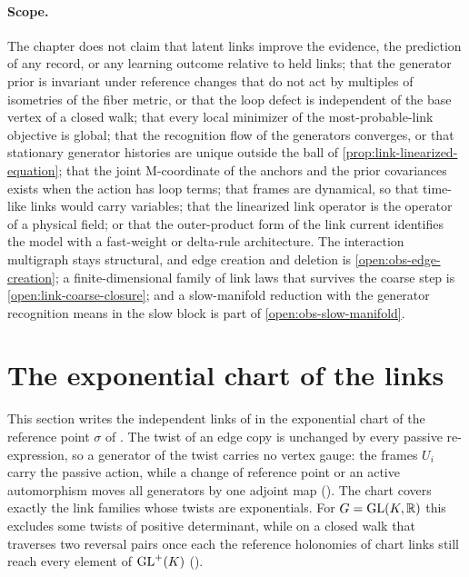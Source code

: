 \paragraph{Scope.}
The chapter does not claim that latent links improve the evidence, the prediction of any record, or any
learning outcome relative to held links; that the generator prior is invariant under reference changes
that do not act by multiples of isometries of the fiber metric, or that the loop defect is independent
of the base vertex of a closed walk; that every local minimizer of the most-probable-link objective is
global; that the recognition flow of the generators converges, or that stationary generator histories
are unique outside the ball of \cref{prop:link-linearized-equation}; that the joint M-coordinate of the
anchors and the prior covariances exists when the action has loop terms; that frames are dynamical, so
that time-like links would carry variables; that the linearized link operator is the operator of a
physical field; or that the outer-product form of the link current identifies the model with a
fast-weight or delta-rule architecture.  The interaction multigraph stays structural, and edge creation and
deletion is \cref{open:obs-edge-creation}; a finite-dimensional family of link laws that survives the
coarse step is \cref{open:link-coarse-closure}; and a slow-manifold reduction with the generator
recognition means in the slow block is part of \cref{open:obs-slow-manifold}.

\section{The exponential chart of the links}
\label{sec:link-chart}

This section writes the independent links of  in the exponential chart of
the reference point $\sigma$ of . The twist of an edge copy is
unchanged by every passive re-expression, so a generator of the twist carries no vertex gauge: the
frames $U_i$ carry the passive action, while a change of reference point or an active automorphism
moves all generators by one adjoint map (). The chart covers exactly
the link families whose twists are exponentials. For $G=\mathrm{GL}(K,\mathbb R)$ this excludes some twists of
positive determinant, while on a closed walk that traverses two reversal pairs once each the
reference holonomies of chart links still reach every element of $\mathrm{GL}^+(K)$
().

